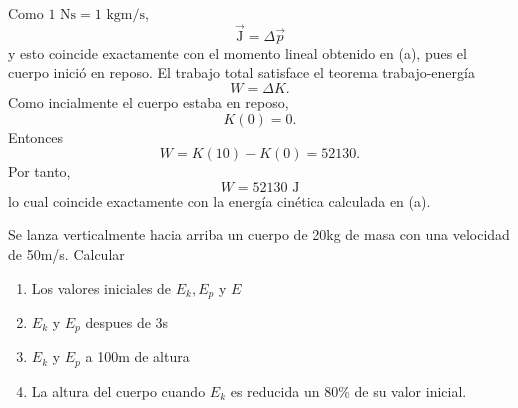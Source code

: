 \documentclass[12pt,a4paper]{article}
\begin{document}
\begin{solucion}
\begin{enumerate}
            Como $1\text{ Ns}=1\text{ kgm/s}$,
            \begin{equation*}
                \vec{\text{J}}=\Delta\vec{p}
            \end{equation*}
            y esto coincide exactamente con el momento lineal obtenido en (a), pues el cuerpo
            inició en reposo. El trabajo total satisface el teorema trabajo-energía
            \begin{equation*}
                W=\Delta K.
            \end{equation*}
            Como incialmente el cuerpo estaba en reposo,
            \begin{equation*}
                K(0)=0.
            \end{equation*}
            Entonces
            \begin{equation*}
                W=K(10)-K(0)=52130.
            \end{equation*}
            Por tanto,
            \begin{equation*}
                W=52130\text{ J}
            \end{equation*}
            lo cual coincide exactamente con la energía cinética calculada en (a).
        \end{enumerate}
    \end{solucion}

    \begin{problema}
        Se lanza verticalmente hacia arriba un cuerpo de 20kg de masa con una velocidad de
        50m/s. Calcular
        \begin{enumerate}
            \item[(a)] Los valores iniciales de $E_{k},E_{p}$ y $E$
            \item[(b)] $E_{k}$ y $E_{p}$ despues de 3s
            \item[(c)] $E_{k}$ y $E_{p}$ a 100m de altura
            \item[(d)] La altura del cuerpo cuando $E_{k}$ es reducida un 80\% de su valor inicial.   
        \end{enumerate}
    \end{problema}
\end{document}
